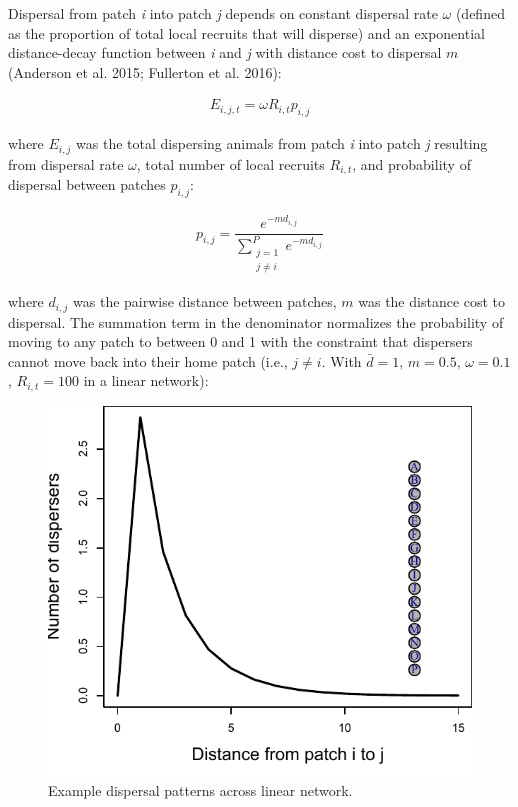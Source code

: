 \documentclass[
]{article}
\begin{document}
Dispersal from patch \emph{i} into patch \emph{j} depends on constant
dispersal rate \(\omega\) (defined as the proportion of total local
recruits that will disperse) and an exponential distance-decay function
between \emph{i} and \emph{j} with distance cost to dispersal \(m\)
(Anderson et al. 2015; Fullerton et al. 2016):

\begin{align}
E_{i,j,t}=\omega R_{i,t}p_{i,j}
\end{align}

where \(E_{i,j}\) was the total dispersing animals from patch \emph{i}
into patch \emph{j} resulting from dispersal rate \(\omega\), total
number of local recruits \(R_{i,t}\), and probability of dispersal
between patches \(p_{i,j}\):

\begin{align}
p_{i,j}=\dfrac{e^{-md_{i,j}}}{\sum\limits_{\substack{j=1 \\ j\neq i}}^{P} e^{-md_{i,j}}}
\end{align}

where \(d_{i,j}\) was the pairwise distance between patches, \(m\) was
the distance cost to dispersal. The summation term in the denominator
normalizes the probability of moving to any patch to between 0 and 1
with the constraint that dispersers cannot move back into their home
patch (i.e., \(j\neq i\). With \(\bar{d}= 1\), \(m=0.5\),
\(\omega=0.1\), \(R_{i,t}=100\) in a linear network):

\begin{figure}[H]

{\centering \includegraphics{Managing_for_ecological_surprises_in_metapopulations_files/figure-latex/dispersal-1} 

}

\caption{Example dispersal patterns across linear network.}\label{fig:dispersal}
\end{figure}
\end{document}
